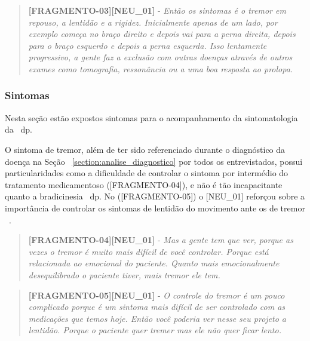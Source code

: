 \begin{quote}
\textbf{[FRAGMENTO-03][NEU\_01]} - 
\emph{
Então os sintomas é o tremor em repouso, a lentidão e a rigidez. Inicialmente apenas de um lado, por exemplo começa no braço direito e depois vai para a perna direita, depois para o braço esquerdo e depois a perna esquerda. Isso lentamente progressivo, a gente faz a exclusão com outras doenças através de outros exames como tomografia, ressonância ou a uma boa resposta ao prolopa.
}
\end{quote}

\subsubsection{Sintomas}
Nesta seção estão expostos sintomas para o acompanhamento da sintomatologia da ~\ac{dp}.

O sintoma de tremor, além de ter sido referenciado durante o diagnóstico da doença na Seção ~\ref{section:analise_diagnostico} por todos os entrevistados, possui particularidades como a dificuldade de controlar o sintoma por intermédio do tratamento medicamentoso ([FRAGMENTO-04]), e não é tão incapacitante quanto a bradicinesia ~\ac{dp}. No ([FRAGMENTO-05]) o [NEU\_01] reforçou sobre a importância de controlar os sintomas de lentidão do movimento ante os de tremor ~\cite{do2007parkinson}.

\begin{quote}
\textbf{[FRAGMENTO-04][NEU\_01]} - 
\emph{
Mas a gente tem que ver, porque as vezes o tremor é muito mais difícil de você controlar. Porque está relacionada ao emocional do paciente. Quanto mais emocionalmente desequilibrado o paciente tiver, mais tremor ele tem.
}
\end{quote}

\begin{quote}
\textbf{[FRAGMENTO-05][NEU\_01]} - 
\emph{
O controle do tremor é um pouco complicado porque é um sintoma mais difícil de ser controlado com as medicações que temos hoje.  Então você poderia ver nesse seu projeto a lentidão. Porque o paciente quer tremer mas ele não quer ficar lento.
}
\end{quote}



